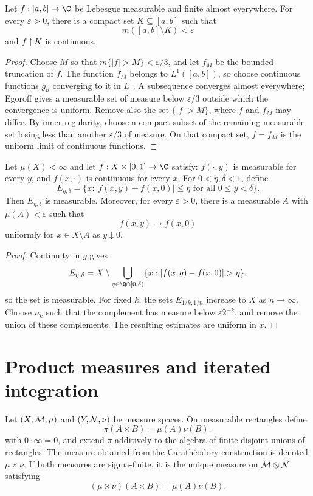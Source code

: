 \begin{thm}[Lusin]
Let $f:[a,b]\to\C$ be Lebesgue measurable and finite almost everywhere. For every $\varepsilon>0$, there is a compact set $K\subseteq[a,b]$ such that
\[
m([a,b]\setminus K)<\varepsilon
\]
and $f\mathbin{\upharpoonright} K$ is continuous.
\end{thm}

\begin{proof}
Choose $M$ so that $m\{|f|>M\}<\varepsilon/3$, and let $f_M$ be the bounded truncation of $f$. The function $f_M$ belongs to $L^1([a,b])$, so choose continuous functions $g_n$ converging to it in $L^1$. A subsequence converges almost everywhere; Egoroff gives a measurable set of measure below $\varepsilon/3$ outside which the convergence is uniform. Remove also the set $\{|f|>M\}$, where $f$ and $f_M$ may differ. By inner regularity, choose a compact subset of the remaining measurable set losing less than another $\varepsilon/3$ of measure. On that compact set, $f=f_M$ is the uniform limit of continuous functions.
\end{proof}

\begin{prop}
Let $\mu(X)<\infty$ and let $f:X\times[0,1]\to\C$ satisfy: $f(\cdot,y)$ is measurable for every $y$, and $f(x,\cdot)$ is continuous for every $x$. For $0<\eta,\delta<1$, define
\[
E_{\eta,\delta}
 =\{x:|f(x,y)-f(x,0)|\leq\eta\text{ for all }0\leq y<\delta\}.
\]
Then $E_{\eta,\delta}$ is measurable. Moreover, for every $\varepsilon>0$, there is a measurable $A$ with $\mu(A)<\varepsilon$ such that
\[
f(x,y)\longrightarrow f(x,0)
\]
uniformly for $x\in X\setminus A$ as $y\downarrow0$.
\end{prop}

\begin{proof}
Continuity in $y$ gives
\[
E_{\eta,\delta}
 =X\setminus
 \bigcup_{q\in\Q\cap[0,\delta)}
 \{x:|f(x,q)-f(x,0)|>\eta\},
\]
so the set is measurable. For fixed $k$, the sets $E_{1/k,1/n}$ increase to $X$ as $n\to\infty$. Choose $n_k$ such that the complement has measure below $\varepsilon2^{-k}$, and remove the union of these complements. The resulting estimates are uniform in $x$.
\end{proof}

\section{Product measures and iterated integration}

\begin{de}
Let $(X,\mathcal{M},\mu)$ and $(Y,\mathcal{N},\nu)$ be measure spaces. On measurable rectangles define
\[
\pi(A\times B)=\mu(A)\nu(B),
\]
with $0\cdot\infty=0$, and extend $\pi$ additively to the algebra of finite disjoint unions of rectangles. The measure obtained from the Carath\'eodory construction is denoted $\mu\times\nu$. If both measures are sigma-finite, it is the unique measure on $\mathcal{M}\otimes\mathcal{N}$ satisfying
\[
(\mu\times\nu)(A\times B)=\mu(A)\nu(B).
\]
\end{de}

